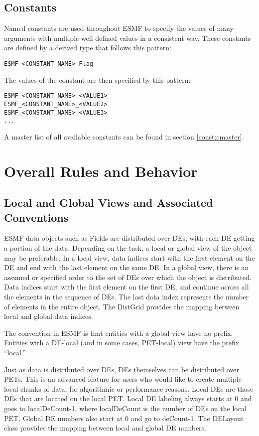 \subsection{Constants}

Named constants are used throughout ESMF to specify the values of many 
arguments with multiple well defined values in a consistent way.  These 
constants are defined by a derived type that follows this pattern:

\begin{verbatim}
ESMF_<CONSTANT_NAME>_Flag
\end{verbatim}

The values of the constant are then specified by this pattern:

\begin{verbatim}
ESMF_<CONSTANT_NAME>_<VALUE1>
ESMF_<CONSTANT_NAME>_<VALUE2>
ESMF_<CONSTANT_NAME>_<VALUE3>
...
\end{verbatim}

A master list of all available constants can be found in section 
\ref{const:cmaster}.

\section{Overall Rules and Behavior}

\subsection{Local and Global Views and Associated Conventions}

ESMF data objects such as Fields are distributed over
DEs, with each DE getting a portion of the data.  Depending
on the task, a local or global view of the object may be
preferable.  In a local view, data indices start with the first
element on the DE and end with the last element on the same DE.
In a global view, there is an assumed or specified order to
the set of DEs over which the object is distributed.  Data
indices start with the first element on the first DE, and
continue across all the elements in the sequence of DEs.
The last data index represents the number of elements in the
entire object.  The DistGrid provides the mapping between
local and global data indices.

The convention in ESMF is that entities with a global view
have no prefix.  Entities with a DE-local (and in some cases,
PET-local) view have the prefix ``local.''

Just as data is distributed over DEs, DEs themselves can be
distributed over PETs.  This is an advanced feature for users
who would like to create multiple local chunks of data, for
algorithmic or performance reasons.
Local DEs are those DEs that are located on the local PET.
Local DE labeling always starts at 0 and goes to localDeCount-1,
where localDeCount is the number of DEs on the local PET.
Global DE numbers also start at 0 and go to deCount-1.
The DELayout class provides the mapping between local
and global DE numbers. 

